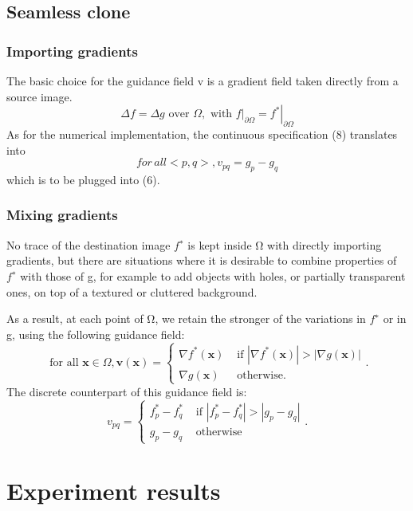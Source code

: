 \documentclass[10pt, a4paper]{article}%
\begin{document}
\subsection{Seamless clone}
\subsubsection{Importing gradients}
The basic choice for the guidance field v is a gradient field taken directly from a source image. 
\begin{equation}
    \Delta f=\Delta g \text { over } \Omega, \text { with }\left.f\right|_{\partial \Omega}=\left.f^*\right|_{\partial \Omega}
\end{equation}
As for the numerical implementation, the continuous specification (8) translates into
\begin{equation}
    for\,all <p,q>, v_{pq}=g_p-g_q
\end{equation}
which is to be plugged into (6).
\subsubsection{Mixing gradients}
 No trace of the destination image $f^∗$ is kept inside Ω with directly importing gradients, but there are situations where it is desirable to combine properties of $f^∗$ with those of g, for example to add objects with holes, or partially transparent ones, on top of a textured or cluttered background.
 
 As a result, at each point of Ω, we retain the stronger of the variations in $f^∗$ or in g, using the following guidance field:
 \begin{equation}
     \text { for all } \mathbf{x} \in \Omega, \mathbf{v}(\mathbf{x})= \begin{cases}\nabla f^*(\mathbf{x}) & \text { if }\left|\nabla f^*(\mathbf{x})\right|>|\nabla g(\mathbf{x})| \\ \nabla g(\mathbf{x}) & \text { otherwise. }\end{cases}.
 \end{equation}
 The discrete counterpart of this guidance field is:
 \begin{equation}
     v_{p q}= \begin{cases}f_p^*-f_q^* & \text { if }\left|f_p^*-f_q^*\right|>\left|g_p-g_q\right| \\ g_p-g_q & \text { otherwise }\end{cases}.
 \end{equation}
 \section{Experiment results}
\end{document}
